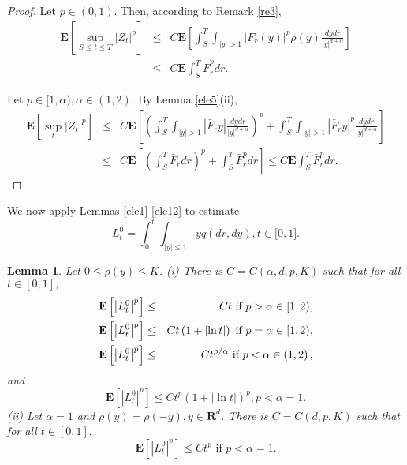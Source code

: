 \documentclass[11pt]{amsart}
\theoremstyle{plain}
\newtheorem{lemma}{Lemma}
\numberwithin{equation}{section}
\begin{document}
\begin{proof}
Let $p\in \left( 0,1\right) $. Then, according to Remark \ref{re3}, 
\begin{eqnarray*}
\mathbf{E}\left[ \sup_{S\leq t\leq T}\left\vert Z_{t}\right\vert ^{p}\right]
&\leq &C\mathbf{E}\left[ \int_{S}^{T}\int_{\left\vert y\right\vert
>1}|F_{r}\left( y\right) |^{p}\rho \left( y\right) \frac{dydr}{\left\vert
y\right\vert ^{d+\alpha }}\right] \\
&\leq &C\mathbf{E}\int_{S}^{T}\bar{F}_{r}^{p}dr.
\end{eqnarray*}

Let $p\in \lbrack 1,\alpha ),\alpha \in \left( 1,2\right) $. By Lemma \ref{ele5}(ii),\begin{eqnarray*}
\mathbf{E}\left[ \sup_{t}\left\vert Z_{t}\right\vert ^{p}\right] &\leq &C\mathbf{E}\left[ \left( \int_{S}^{T}\int_{\left\vert y\right\vert
>1}\left\vert \bar{F}_{r}y\right\vert \frac{dydr}{\left\vert y\right\vert
^{d+\alpha }}\right) ^{p}+\int_{S}^{T}\int_{\left\vert y\right\vert
>1}\left\vert \bar{F}_{r}y\right\vert ^{p}\frac{dydr}{\left\vert
y\right\vert ^{d+\alpha }}\right] \\
&\leq &C\mathbf{E}\left[ \left( \int_{S}^{T}\bar{F}_{r}dr\right)
^{p}+\int_{S}^{T}\bar{F}_{r}^{p}dr\right] \leq C\mathbf{E}\int_{S}^{T}\bar{F}_{r}^{p}dr.
\end{eqnarray*}
\end{proof}

We now apply Lemmas \ref{ele1}-\ref{ele12} to estimate 
\begin{equation*}
L_{t}^{0}=\int_{0}^{t}\int_{\left\vert y\right\vert \leq 1}yq\left(
dr,dy\right) ,t\in \lbrack 0,1].
\end{equation*}

\begin{lemma}
\label{c1}Let $0\leq \rho \left( y\right) \leq K$.\newline
(i) There is $C=C\left( \alpha,d ,p,K\right) $ such that for all $t\in \left[
0,1\right] ,$\begin{eqnarray}
\mathbf{E}\left[ \left\vert L_{t}^{0}\right\vert ^{p}\right] &\leq &Ct\text{
if }p>\alpha \in \lbrack 1,2),  \notag \\
\mathbf{E}\left[ \left\vert L_{t}^{0}\right\vert ^{p}\right] &\leq &Ct\left(
1+\left\vert \ln t\right\vert \right) \text{ if }p=\alpha \in \lbrack 1,2), 
\notag \\
\mathbf{E}\left[ \left\vert L_{t}^{0}\right\vert ^{p}\right] &\leq
&Ct^{p/\alpha }\text{ if }p<\alpha \in \left( 1,2\right) ,  \notag
\end{eqnarray}and\begin{equation*}
\mathbf{E}\left[ \left\vert L_{t}^{0}\right\vert ^{p}\right] \leq
Ct^{p}\left( 1+\left\vert \ln t\right\vert \right) ^{p},p<\alpha =1.
\end{equation*}(ii) Let $\alpha =1$ and $\rho \left( y\right) =\rho \left( -y\right) ,y\in 
\mathbf{R}^{d}$. There is $C=C(d,p,K)$ such that for all $t\in \left[ 0,1\right] ,$\begin{equation*}
\mathbf{E}\left[ \left\vert L_{t}^{0}\right\vert ^{p}\right] \leq Ct^{p}\text{ if }p<\alpha =1.
\end{equation*}
\end{lemma}
\end{document}
